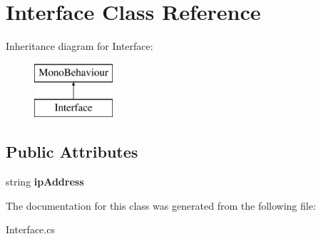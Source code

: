 \hypertarget{class_interface}{}\section{Interface Class Reference}
\label{class_interface}
Inheritance diagram for Interface\+:\begin{figure}[H]
\begin{center}
\leavevmode
\includegraphics[height=2.000000cm]{class_interface}
\end{center}
\end{figure}
\subsection*{Public Attributes}
\begin{DoxyCompactItemize}
\item 
\hypertarget{class_interface_aef5223ae4a813051a04a201cb2b4dacb}{}string {\bfseries ip\+Address}\label{class_interface_aef5223ae4a813051a04a201cb2b4dacb}

\end{DoxyCompactItemize}


The documentation for this class was generated from the following file\+:\begin{DoxyCompactItemize}
\item 
Interface.\+cs\end{DoxyCompactItemize}
